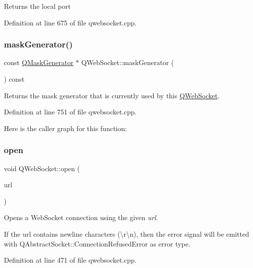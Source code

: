Returns the local port 

Definition at line 675 of file qwebsocket.\+cpp.

\mbox{\label{class_q_web_socket_a20ba00f459a7e448bd611a24500d94c6}} 
\subsubsection{\texorpdfstring{mask\+Generator()}{maskGenerator()}}
{\footnotesize\ttfamily const \mbox{\hyperlink{class_q_mask_generator}{Q\+Mask\+Generator}} $\ast$ Q\+Web\+Socket\+::mask\+Generator (\begin{DoxyParamCaption}{ }\end{DoxyParamCaption}) const}

Returns the mask generator that is currently used by this \mbox{\hyperlink{class_q_web_socket}{Q\+Web\+Socket}}. 

Definition at line 751 of file qwebsocket.\+cpp.

Here is the caller graph for this function\+:
\mbox{\label{class_q_web_socket_ac0351c89316b6914a58bc2f5c8ed9e6b}} 
\subsubsection{\texorpdfstring{open}{open}\hspace{0.1cm}{\footnotesize\ttfamily [1/2]}}
{\footnotesize\ttfamily void Q\+Web\+Socket\+::open (\begin{DoxyParamCaption}\item[{const Q\+Url \&}]{url }\end{DoxyParamCaption})\hspace{0.3cm}{\ttfamily [slot]}}



Opens a Web\+Socket connection using the given {\itshape url}. 

If the url contains newline characters (\textbackslash{}r\textbackslash{}n), then the error signal will be emitted with Q\+Abstract\+Socket\+::\+Connection\+Refused\+Error as error type. 

Definition at line 471 of file qwebsocket.\+cpp.

